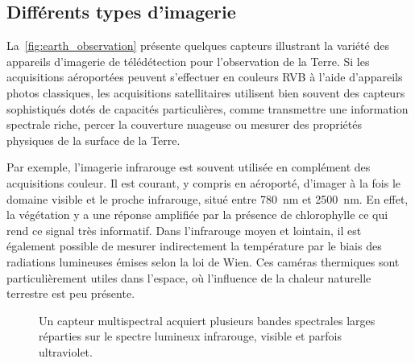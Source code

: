\subsection{Différents types d'imagerie}

La~\cref{fig:earth_observation} présente quelques capteurs illustrant la variété des appareils d'imagerie de télédétection pour l'observation de la Terre. Si les acquisitions aéroportées peuvent s'effectuer en couleurs \gls{RVB} à l'aide d'appareils photos classiques, les acquisitions satellitaires utilisent bien souvent des capteurs sophistiqués dotés de capacités particulières, comme transmettre une information spectrale riche, percer la couverture nuageuse ou mesurer des propriétés physiques de la surface de la Terre.

Par exemple, l'imagerie infrarouge est souvent utilisée en complément des acquisitions couleur. Il est courant, y compris en aéroporté, d'imager à la fois le domaine visible et le proche infrarouge, situé entre \SI{780}{\nano\meter} et \SI{2 500}{\nano\meter}. En effet, la végétation y a une réponse amplifiée par la présence de chlorophylle ce qui rend ce signal très informatif. Dans l'infrarouge moyen et lointain, il est également possible de mesurer indirectement la température par le biais des radiations lumineuses émises selon la loi de Wien. Ces caméras thermiques sont particulièrement utiles dans l'espace, où l'influence de la chaleur naturelle terrestre est peu présente.

\begin{figure}
  \resizebox{\textwidth}{!}{
  
  }
  \caption{Un capteur multispectral acquiert plusieurs bandes spectrales larges réparties sur le spectre lumineux infrarouge, visible et parfois ultraviolet.}
  \label{fig:multispectral}
\end{figure}


